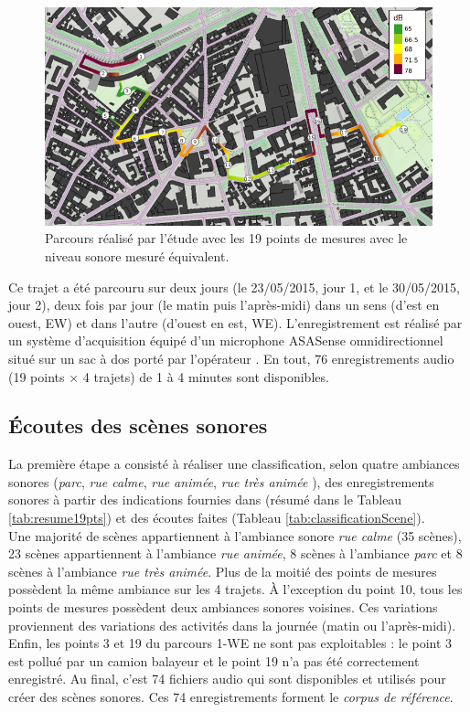 \begin{figure}[hbtp]
\centering
\includegraphics[width=.7\textwidth]{./figures/grafic/trajet_19pts.png}
\caption{Parcours réalisé par l'étude avec les 19 points de mesures avec le niveau sonore mesuré équivalent.}
\label{fig:parcoursGRAFIC}
\end{figure}

Ce trajet a été parcouru sur deux jours (le 23/05/2015, jour 1, et le 30/05/2015, jour 2), deux fois par jour (le matin puis l'après-midi) dans un sens (d'est en ouest, EW) et dans l'autre (d'ouest en est, WE). L'enregistrement est réalisé par un système d'acquisition équipé d'un microphone ASASense omnidirectionnel situé sur un sac à dos porté par l'opérateur \cite{aumond2017modeling}. En tout, 76 enregistrements audio (19 points $\times$ 4 trajets) de 1 à 4 minutes sont disponibles. \\




\subsection{Écoutes des scènes sonores}

La première étape a consisté à réaliser une classification, selon quatre ambiances sonores (\textit{parc}, \textit{rue calme}, \textit{rue animée}, \textit{rue très animée} \cite{can_describing_2015}), des enregistrements sonores à partir des indications fournies dans \cite{aumond2017modeling} (résumé dans le Tableau \ref{tab:resume19pts}) et des écoutes faites (Tableau \ref{tab:classificationScene}).\\



Une majorité de scènes appartiennent à l'ambiance sonore \textit{rue calme} (35 scènes), 23 scènes appartiennent à l'ambiance \textit{rue animée}, 8 scènes à l'ambiance \textit{parc} et 8 scènes à l'ambiance \textit{rue très animée}. Plus de la moitié des points de mesures possèdent la même ambiance sur les 4 trajets. À l'exception du point 10, tous les points de mesures possèdent deux ambiances sonores voisines. Ces variations proviennent des variations des activités dans la journée (matin ou l'après-midi). Enfin, les points 3 et 19 du parcours 1-WE ne sont pas exploitables : le point 3 est pollué par un camion balayeur et le point 19 n'a pas été correctement enregistré. Au final, c'est 74 fichiers audio qui sont disponibles et utilisés pour créer des scènes sonores. Ces 74 enregistrements forment le \textit{corpus de référence}.

